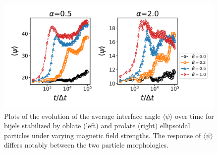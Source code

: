 

\begin{figure} 
    \centering 
    \includegraphics[scale=0.6]{../figures/results/paper2/psi-field_on.png} 
    \caption{Plots of the evolution of the average interface angle \(\langle \psi \rangle\) over time for bijels stabilized 
             by oblate (left) and prolate (right) ellipsoidal particles under varying magnetic field strengths. The response of \(\langle \psi \rangle\) 
             differs notably between the two particle morphologies.} 
    \label{fig:interface_angle-field_on} 
\end{figure}

